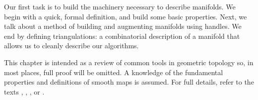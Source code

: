 Our first task is to build the machinery necessary to describe manifolds.
We begin with a quick, formal definition, and build some basic properties.
Next, we talk about a method of building and augmenting manifolds using handles.
We end by defining triangulations: a combinatorial description of a manifold that allows us to cleanly describe our algorithms.

This chapter is intended as a review of common tools in geometric topology so, in most places, full proof will be omitted.
A knowledge of the fundamental properties and definitions of smooth maps is assumed.
For full details, refer to the texts \cite{GompStip}, \cite{Hirsch67}, \cite{Kosi93}, or \cite{Lee00}.